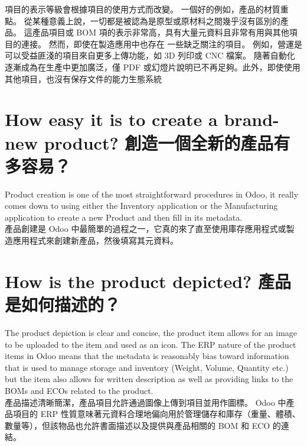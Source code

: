 \fontsize{12pt}{2.5pt}\selectfont
{項目的表示等級會根據項目的使用方式而改變。 一個好的例如，產品的材質重點。 從某種意義上說，一切都是被認為是原型或原材料之間幾乎沒有區別的產品。 這產品項目或 BOM 項的表示非常高，具有大量元資料且非常有用與其他項目的連接。 然而，即使在製造應用中也存在
一些缺乏關注的項目。 例如，營運是可以受益匪淺的項目來自更多上傳功能，如 3D 列印或 CNC 檔案。 隨著自動化逐漸成為在生產中更加廣泛，僅 PDF 或幻燈片說明已不再足夠。此外，即使使用其他項目，也沒有保存文件的能力生態系統}\\[1pt]

\section{How easy it is to create a brand-new product? 創造一個全新的產品有多容易？}
\fontsize{12pt}{2.5pt}\selectfont 
{Product creation is one of the most straightforward procedures in Odoo, it really comes down to using either the Inventory
application or the Manufacturing application to create a new Product and then fill in its metadata. }\\[1pt]

\fontsize{12pt}{2.5pt}\selectfont
{產品創建是 Odoo 中最簡單的過程之一，它真的來了直至使用庫存應用程式或製造應用程式來創建新產品，然後填寫其元資料。}\\[1pt]

\section{How is the product depicted? 產品是如何描述的？}
\fontsize{12pt}{2.5pt}\selectfont 
{The product depiction is clear and concise, the product item allows for an image to be uploaded to the item and used as an icon. The ERP nature of the product items in Odoo means that the metadata is reasonably bias toward information that is used to manage storage and inventory (Weight, Volume, Quantity etc.) but the item also allows for written description as well as providing links to the BOMs and ECOs related to the product. }\\[1pt]

\fontsize{12pt}{2.5pt}\selectfont
{產品描述清晰簡潔，產品項目允許通過圖像上傳到項目並用作圖標。 Odoo 中產品項目的 ERP 性質意味著元資料合理地偏向用於管理儲存和庫存（重量、體積、數量等），但該物品也允許書面描述以及提供與產品相關的 BOM 和 ECO 的連結。}\\[1pt]

